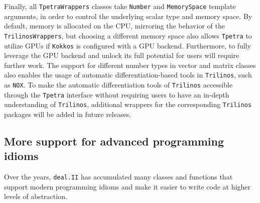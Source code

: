 \documentclass{ansarticle-preprint}
\newcommand{\specialword}[1]{\texttt{#1}}
\newcommand{\dealii}{{\specialword{deal.II}}\xspace}
\newcommand{\trilinos}{{\specialword{Trilinos}}\xspace}
\newcommand{\kokkos}{{\specialword{Kokkos}}\xspace}
\newcommand{\tpetra}{{\specialword{Tpetra}}\xspace}
\begin{document}
Finally,
all \texttt{TpetraWrappers} classes take \texttt{Number} and \texttt{MemorySpace} template arguments,
in order to control the underlying scalar type and memory space.
By default, memory is allocated on the CPU, mirroring the behavior of
the \texttt{TrilinosWrappers}, but choosing a different memory space
also allows \tpetra{} to utilize GPUs if \kokkos{} is configured
with a GPU backend.
Furthermore, to fully leverage the GPU backend and unlock its full potential for users will require further work.
The support for different number types in vector and matrix classes also enables the usage of automatic differentiation-based tools in
\trilinos{}, such as \texttt{NOX}.
To make the automatic differentiation tools of \trilinos{} accessible through the \tpetra{} interface without
requiring users to have an in-depth understanding of \trilinos{}, additional wrappers for the corresponding
\trilinos{} packages will be added in future releases.

\subsection{More support for advanced programming idioms}\label{sec:tools}

Over the years, \dealii{} has accumulated many classes and functions
that support modern programming idioms and make it easier to write
code at higher levels of abstraction.
\end{document}
